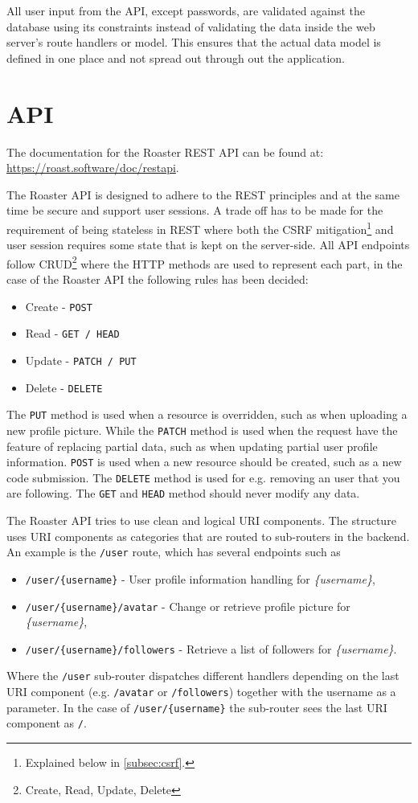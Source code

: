 \documentclass[12pt,a4paper]{report}
\begin{document}
All user input from the API, except passwords, are validated against the database using its constraints instead of validating the data inside the web server's route handlers or model. This ensures that the actual data model is defined in one place and not spread out through out the application.

\section{API}
\label{sec:api-design}
The documentation for the Roaster REST API can be found at: \\ \url{https://roast.software/doc/restapi}.

The Roaster API is designed to adhere to the REST principles and at the same time be secure and support user sessions. A trade off has to be made for the requirement of being stateless in REST\cite{fielding-rest} where both the CSRF mitigation\footnote{Explained below in \autoref{subsec:csrf}.} and user session requires some state that is kept on the server-side. All API endpoints follow CRUD\footnote{Create, Read, Update, Delete} where the HTTP methods are used to represent each part, in the case of the Roaster API the following rules has been decided:
\begin{itemize}
    \item Create - \texttt{POST}
    \item Read - \texttt{GET / HEAD}
    \item Update - \texttt{PATCH / PUT}
    \item Delete - \texttt{DELETE}
\end{itemize}
The \texttt{PUT} method is used when a resource is overridden, such as when uploading a new profile picture. While the \texttt{PATCH} method is used when the request have the feature of replacing partial data, such as when updating partial user profile information. \texttt{POST} is used when a new resource should be created, such as a new code submission. The \texttt{DELETE} method is used for e.g. removing an user that you are following. The \texttt{GET} and \texttt{HEAD} method should never modify any data.

The Roaster API tries to use clean and logical URI components. The structure uses URI components as categories that are routed to sub-routers in the backend. An example is the \texttt{/user} route, which has several endpoints such as
\begin{itemize}
    \item \texttt{/user/\{username\}} - User profile information handling for \textit{\{username\}},
    \item \texttt{/user/\{username\}/avatar} - Change or retrieve profile picture for \textit{\{username\}},
    \item \texttt{/user/\{username\}/followers} - Retrieve a list of followers for \textit{\{username\}}.
\end{itemize}
Where the \texttt{/user} sub-router dispatches different handlers depending on the last URI component (e.g. \texttt{/avatar} or \texttt{/followers}) together with the username as a parameter. In the case of \texttt{/user/\{username\}} the sub-router sees the last URI component as \texttt{/}.
\end{document}
